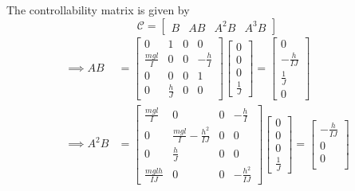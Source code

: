 The controllability matrix is given by
\begin{equation*}
    \mathcal{C}
    =
    \begin{bmatrix}
        B & AB & A^{2}B & A^{3}B
    \end{bmatrix}
\end{equation*}
\begin{align*}
    \implies
    AB
     & =
    \begin{bmatrix}
        0               & 1           & 0 & 0            \\
        \frac{m g l}{I} & 0           & 0 & -\frac{h}{I} \\
        0               & 0           & 0 & 1            \\
        0               & \frac{h}{J} & 0 & 0
    \end{bmatrix}
    \begin{bmatrix}
        0 \\ 0 \\ 0 \\ \frac{1}{J}
    \end{bmatrix}
    =
    \begin{bmatrix}
        0              \\
        - \frac{h}{IJ} \\
        \frac{1}{J}    \\
        0
    \end{bmatrix}
    \\
    \implies
    A^{2}B
     & =
    \begin{bmatrix}
        \frac{m g l}{I} & 0                              & 0 & -\frac{h}{I}    \\
        0               & \frac{m g l}{I}-\frac{h^2}{IJ} & 0 & 0               \\
        0               & \frac{h}{J}                    & 0 & 0               \\
        \frac{mglh}{IJ} & 0                              & 0 & -\frac{h^2}{IJ}
    \end{bmatrix}
    \begin{bmatrix}
        0 \\ 0 \\ 0 \\ \frac{1}{J}
    \end{bmatrix}
    =
    \begin{bmatrix}
        -\frac{h}{IJ} \\
        0             \\
        0             \\

\end{bmatrix}
\end{align*}
